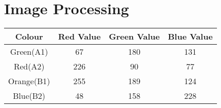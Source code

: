 \chapter{Image Processing}
\label{cha:IP}

\begin{table}[h]\small
    \begin{tabular}{c|ccc}
    \hline 
    Colour&Red Value&Green Value&Blue Value\\
    \hline 
    Green(A1)&67&180&131\\
    Red(A2)&226&90&77\\
    Orange(B1)&255&189&124\\
    Blue(B2)&48&158&228\\
    \hline 
    \end{tabular}
    \end{table}